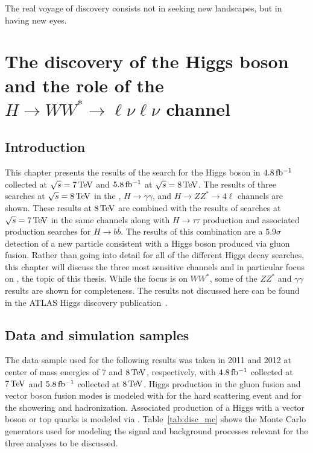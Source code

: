 \begin{savequote}[75mm]
The real voyage of discovery consists not in seeking new landscapes, but in having new eyes.
\end{savequote}

\chapter{The discovery of the Higgs boson and the role of the $H\rightarrow WW^{*}\rightarrow \ell\nu\ell\nu$ channel}

\section{Introduction}

This chapter presents the results of the search for the Higgs boson in $4.8 \mbox{\,fb$^{-1}$}$ collected at $\sqrt{s} = 7 \TeV$ and $5.8 \mbox{\,fb$^{-1}$}$ at $\sqrt{s} = 8 \TeV$. The results of three searches at $\sqrt{s} = 8 \TeV$ in the \HWWfull, $H\to \gamma \gamma$, and $H\to ZZ^* \to 4\ell$ channels are shown. These results at $8 \TeV$ are combined with the results of searches at $\sqrt{s} = 7 \TeV$ in the same channels along with $H\to\tau\tau$ production and associated production searches for $H\to b\bar{b}$. The results of this combination are a $5.9 \sigma$ detection of a new particle consistent with a Higgs boson produced via gluon fusion. Rather than going into detail for all of the different Higgs decay searches, this chapter will discuss the three most sensitive channels and in particular focus on \HWWfull, the topic of this thesis. While the focus is on $WW^*$, some of the $ZZ^*$ and $\gamma\gamma$ results are shown for completeness. The results not discussed here can be found in the ATLAS Higgs discovery publication~\cite{Discovery}.


\section{Data and simulation samples}

The data sample used for the following results was taken in 2011 and 2012 at center of mass energies of $7$ and $8 \TeV$, respectively, with $4.8 \mbox{\,fb$^{-1}$}$ collected at $7 \TeV$ and $5.8 \mbox{\,fb$^{-1}$}$ collected at $8 \TeV$. Higgs production in the gluon fusion and vector boson fusion modes is modeled with \POWHEG for the hard scattering event and \PYTHIA for the showering and hadronization. Associated production of a Higgs with a vector boson or top quarks is modeled via \PYTHIA. Table~\ref{tab:disc_mc} shows the Monte Carlo generators used for modeling the signal and background processes relevant for the three analyses to be discussed. 

